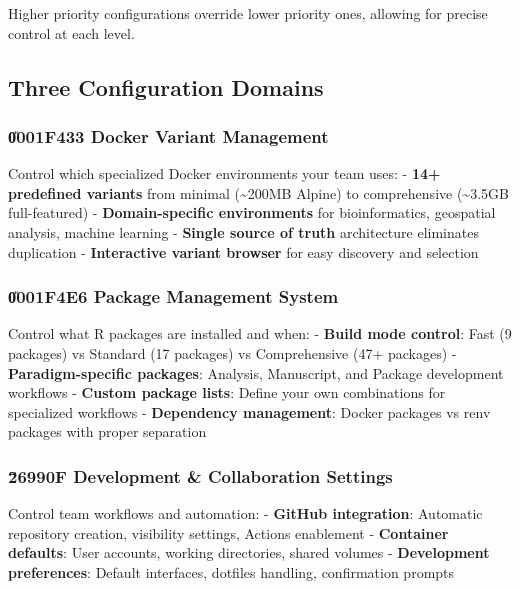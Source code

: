 \documentclass[
]{article}
\begin{document}
Higher priority configurations override lower priority ones, allowing
for precise control at each level.

\subsection{Three Configuration
Domains}\label{three-configuration-domains}

\subsubsection{\texorpdfstring{\U0001F433 Docker Variant
Management}{001F433 Docker Variant Management}}\label{f433-docker-variant-management}

Control which specialized Docker environments your team uses: -
\textbf{14+ predefined variants} from minimal (\textasciitilde200MB
Alpine) to comprehensive (\textasciitilde3.5GB full-featured) -
\textbf{Domain-specific environments} for bioinformatics, geospatial
analysis, machine learning - \textbf{Single source of truth}
architecture eliminates duplication - \textbf{Interactive variant
browser} for easy discovery and selection

\subsubsection{\texorpdfstring{\U0001F4E6 Package Management
System}{001F4E6 Package Management System}}\label{f4e6-package-management-system}

Control what R packages are installed and when: - \textbf{Build mode
control}: Fast (9 packages) vs Standard (17 packages) vs Comprehensive
(47+ packages) - \textbf{Paradigm-specific packages}: Analysis,
Manuscript, and Package development workflows - \textbf{Custom package
lists}: Define your own combinations for specialized workflows -
\textbf{Dependency management}: Docker packages vs renv packages with
proper separation

\subsubsection{\texorpdfstring{\u2699\uFE0F Development \& Collaboration
Settings}{6990F Development \& Collaboration Settings}}\label{f-development-collaboration-settings}

Control team workflows and automation: - \textbf{GitHub integration}:
Automatic repository creation, visibility settings, Actions enablement -
\textbf{Container defaults}: User accounts, working directories, shared
volumes - \textbf{Development preferences}: Default interfaces, dotfiles
handling, confirmation prompts
\end{document}
